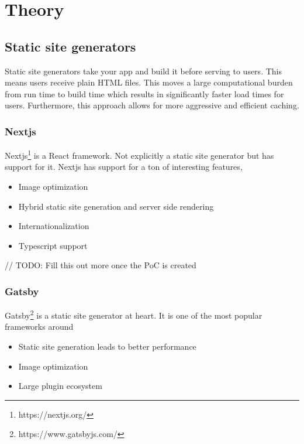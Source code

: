 
\chapter{Theory} %

\label{Chapter3} 


\section{Static site generators}

Static site generators take your app and build it before serving to users. 
This means users receive plain HTML files. This moves a large computational burden from run time to build time which results in significantly faster load times for users.
Furthermore, this approach allows for more aggressive and efficient caching.

\subsection{Nextjs}

Nextjs\footnote{https://nextjs.org/} is a React framework. Not explicitly a static site generator but has support for it. Nextjs has support for a ton of interesting features, 

\begin{itemize}
	\item Image optimization
	\item Hybrid static site generation and server side rendering
	\item Internationalization
	\item Typescript support
\end{itemize}

// TODO: Fill this out more once the PoC is created

\subsection{Gatsby}

Gatsby\footnote{https://www.gatsbyjs.com/} is a static site generator at heart. It is one of the most popular frameworks around

\begin{itemize}
	\item Static site generation leads to better performance
	\item Image optimization
	\item Large plugin ecosystem
\end{itemize}



